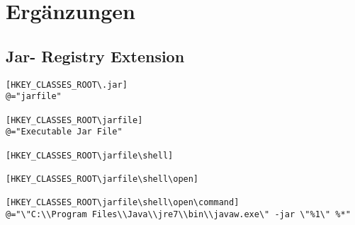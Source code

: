 \section{Ergänzungen}
\label{sec:Ergänzungen}

\subsection{Jar- Registry Extension}
\label{subsec:jarreg}

\begin{lstlisting}
[HKEY_CLASSES_ROOT\.jar]
@="jarfile"

[HKEY_CLASSES_ROOT\jarfile]
@="Executable Jar File"

[HKEY_CLASSES_ROOT\jarfile\shell]

[HKEY_CLASSES_ROOT\jarfile\shell\open]

[HKEY_CLASSES_ROOT\jarfile\shell\open\command]
@="\"C:\\Program Files\\Java\\jre7\\bin\\javaw.exe\" -jar \"%1\" %*"
\end{lstlisting}